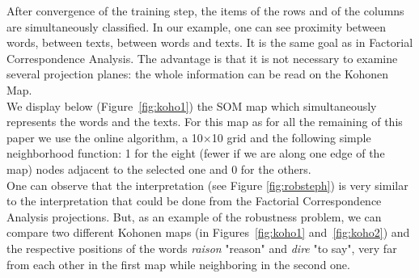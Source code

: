 \documentclass[preprint]{elsarticle}
\begin{document}
After convergence of the training step, the items of the rows and of the columns are simultaneously classified. In our example, one can see proximity between words, between texts, between words and texts. It is the same goal as in Factorial Correspondence Analysis. The advantage is that it is not necessary to examine several projection planes: the whole information can be read on the Kohonen Map.\\

We display below (Figure~\ref{fig:koho1}) the SOM map which simultaneously represents the words and the texts. For this map as for all the remaining of this paper we use the online algorithm, a 10$\times$10 grid and the following simple neighborhood function: 1 for the eight (fewer if we are along one edge of the map) nodes adjacent to the selected one and 0 for the others.\\

One can observe that the interpretation (see Figure \ref{fig:robsteph}) is very similar to the interpretation that could be done from the Factorial Correspondence Analysis projections.
But, as an example of the robustness problem, we can compare two different Kohonen maps (in Figures~\ref{fig:koho1} and~\ref{fig:koho2}) and the respective positions of the words \textit{raison} "reason" and \textit{dire} "to say", very far from each other in the first map while neighboring in the second one.\\

\setlength{\tabcolsep}{1mm}
\setlength{\arrayrulewidth}{1pt}
\end{document}
